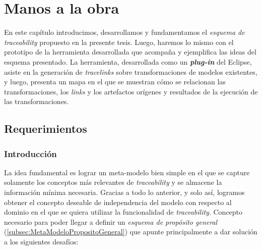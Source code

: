 \documentclass[a4paper,12pt,oneside,spanish]{book}
\begin{document}
\chapter{Manos a la obra}
\label{cap:Propuesta}

En este capítulo introducimos, desarrollamos y fundamentamos el \textit{esquema de
traceability} propuesto en la presente tesis. Luego, haremos lo mismo con el prototipo de la herramienta desarrollada que acompaña y ejemplifica las ideas del esquema presentado. 
La herramienta, desarrollada como un \textit{\textbf{plug-in}} del  Eclipse, asiste en la generación de \textit{tracelinks} sobre transformaciones de modelos existentes, y luego, presenta un mapa en el que se muestran cómo se relacionan las transformaciones, los \textit{links} y los artefactos orígenes y resultados de la ejecución de las transformaciones.



\section{Requerimientos}


\subsection{Introducción}
\label{sec:EsquemaPropIntro}

La idea fundamental es lograr un meta-modelo bien simple en el que se capture solamente los conceptos más relevantes de \textit{traceability} y se almacene la información mínima necesaria. Gracias a todo lo anterior, y solo así, logramos obtener el concepto deseable de independencia del modelo con respecto al dominio en el que se quiera utilizar la funcionalidad de \textit{traceability}. Concepto necesario para poder llegar a definir un \textit{esquema de propósito general} (\ref{subsec:MetaModeloPropositoGeneral}) que apunte principalmente a dar solución a los siguientes desafíos:
\end{document}
